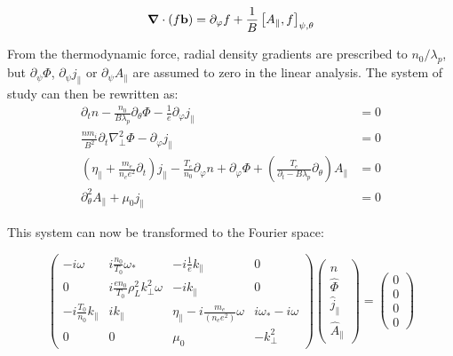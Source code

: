 \begin{equation}
	\grad \cdot (f\mathbf{b}) = \partial_\varphi f + \frac{1}{B}\left[A_\parallel,f\right]_{\psi,\theta}
\end{equation}

From the thermodynamic force, radial density gradients are prescribed to $n_0 / \lambda_p$, but $\partial_\psi\Phi$, $\partial_\psi j_\parallel$ or $\partial_\psi A_\parallel$ are assumed to zero in the linear analysis. The system of study can then be rewritten as:
\begin{align}
	\partial_t n - \frac{n_0}{B\lambda_p}\partial_\theta\Phi - \frac{1}{e}\partial_\varphi j_\parallel &= 0 \\
	\frac{nm_i}{B^2}\partial_t\nabla_\perp^2\Phi - \partial_\varphi j_\parallel &= 0\\
	\left(\eta_\parallel + \frac{m_e}{n_ee^2}\partial_t \right) j_\parallel - \frac{T_e}{n_0}\partial_\varphi n + \partial_\varphi \Phi  + \left(\frac{T_e}{\partial_t - B\lambda_p}\partial_\theta\right) A_\parallel &= 0 \\
	\partial_\theta^2 A_\parallel + \mu_0 j_\parallel &= 0
\end{align}

This system can now be transformed to the Fourier space:

\begin{equation}
	\begin{pmatrix}
		-i\omega                  & i\frac{n_0}{T_0}\omega_*    & -i\frac{1}{e}k_\parallel & 0                  \\ 
		0                         & i\frac{en_0}{T_0}\rho_L^2k_\perp^2\omega        & -ik_\parallel            & 0                  \\ 
		-i\frac{T_0}{n_0}k_\parallel & ik_\parallel & \eta_\parallel - i\frac{m_e}{(n_ee^2)}\omega & i\omega_* - i\omega \\ 
		0                         & 0                             & \mu_0                   & -k_\perp^2
	\end{pmatrix}\begin{pmatrix}
		\hat{n} \\ \hat{\Phi} \\ \hat{j}_\parallel \\ \hat{A}_\parallel
	\end{pmatrix} = \begin{pmatrix}
		0 \\ 0 \\ 0 \\ 0
 	\end{pmatrix}
\end{equation}

